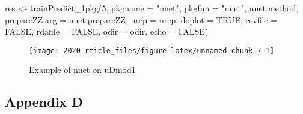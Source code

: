 \begin{Schunk}
\begin{Sinput}
res <- trainPredict_1pkg(5, pkgname = "nnet", pkgfun = "nnet", nnet.method,
  prepareZZ.arg = nnet.prepareZZ, nrep = nrep, doplot = TRUE,
  csvfile = FALSE, rdafile = FALSE, odir = odir, echo = FALSE)
\end{Sinput}
\begin{figure}

{\centering \texttt{[image: 2020-rticle\_files/figure-latex/unnamed-chunk-7-1]} 

}

\caption[Example of nnet on uDmod1]{Example of nnet on uDmod1}\label{fig:unnamed-chunk-7}
\end{figure}
\end{Schunk}

\hypertarget{appendix-d}{%
\subsection{Appendix D}\label{appendix-d}}

